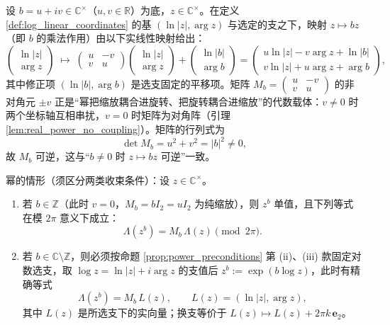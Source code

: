 \begin{theorem}[幂在对数坐标下的矩阵形式]\label{thm:power_matrix_log_coordinates}
设 $b=u+iv\in\mathbb{C}^{\times}$（$u,v\in\mathbb{R}$）为底，$z\in\mathbb{C}^{\times}$。在定义 \ref{def:log_linear_coordinates} 的基 $(\ln|z|,\arg z)$ 与选定的支之下，映射 $z\mapsto bz$（即 $b$ 的乘法作用）由以下实线性映射给出：
\[
\begin{pmatrix}\ln|z|\\ \arg z\end{pmatrix}
\;\longmapsto\;
\begin{pmatrix}u&-v\\ v&u\end{pmatrix}
\begin{pmatrix}\ln|z|\\ \arg z\end{pmatrix}
+\begin{pmatrix}\ln|b|\\ \arg b\end{pmatrix}
=\begin{pmatrix}u\ln|z|-v\arg z+\ln|b|\\ v\ln|z|+u\arg z+\arg b\end{pmatrix},
\]
其中修正项 $(\ln|b|,\arg b)$ 是选支固定的平移项。矩阵 $M_b=\begin{pmatrix}u&-v\\ v&u\end{pmatrix}$ 的非对角元 $\pm v$ 正是“幂把缩放耦合进旋转、把旋转耦合进缩放”的代数载体：$v\neq0$ 时两个坐标轴互相串扰，$v=0$ 时矩阵为对角阵（引理 \ref{lem:real_power_no_coupling}）。矩阵的行列式为
\[
\det M_b=u^2+v^2=|b|^2\neq0,
\]
故 $M_b$ 可逆，这与“$b\neq0$ 时 $z\mapsto bz$ 可逆”一致。

幂的情形（须区分两类收束条件）：设 $z\in\mathbb{C}^{\times}$。
\begin{enumerate}[label=(\roman*)]
    \item 若 $b\in\mathbb{Z}$（此时 $v=0$，$M_b=bI_2=uI_2$ 为纯缩放），则 $z^b$ 单值，且下列等式在模 $2\pi$ 意义下成立：
    \[
    \Lambda(z^b)=M_b\,\Lambda(z)\pmod{2\pi}.
    \]
    \item 若 $b\in\mathbb{C}\setminus\mathbb{Z}$，则必须按命题 \ref{prop:power_preconditions} 第 (ii)、(iii) 款固定对数选支，取 $\log z=\ln|z|+i\arg z$ 的支值后 $z^b:=\exp(b\log z)$，此时有精确等式
    \[
    \Lambda(z^b)=M_b\,L(z),\qquad L(z)=(\ln|z|,\arg z),
    \]
    其中 $L(z)$ 是所选支下的实向量；换支等价于 $L(z)\mapsto L(z)+2\pi k\,\mathbf{e}_2$。
\end{enumerate}
\end{theorem}

